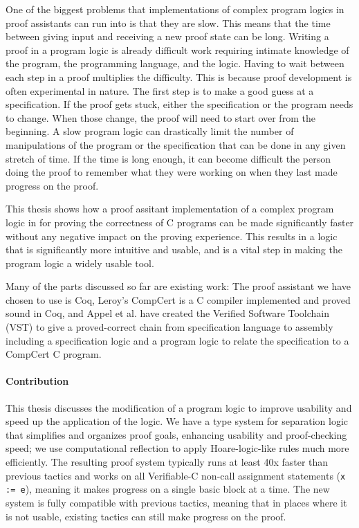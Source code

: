 \documentclass{puthesis}
\begin{document}
One of the biggest problems that implementations of complex program
logics in proof assistants can run into is that they are slow. This
means that the time between giving input and receiving a new proof
state can be long. Writing a proof in a program logic is already
difficult work requiring intimate knowledge of the program, the
programming language, and the logic. Having to wait between each step
in a proof multiplies the difficulty.  This is because proof
development is often experimental in nature. The first step is to make
a good guess at a specification. If the proof gets stuck, either the
specification or the program needs to change. When those change, the
proof will need to start over from the beginning. A slow program logic
can drastically limit the number of manipulations of the program or
the specification that can be done in any given stretch of time. If
the time is long enough, it can become difficult the person doing the
proof to remember what they were working on when they last made
progress on the proof.

This thesis shows how a proof assitant implementation of a complex
program logic in for proving the correctness of C programs can be made
significantly faster without any negative impact on the proving
experience. This results in a logic that is significantly more
intuitive and usable, and is a vital step in making the program logic
a widely usable tool.

Many of the parts discussed so far are existing work: The proof
assistant we have chosen to use is Coq, Leroy's CompCert
\cite{Leroy-Compcert-CACM} is a C compiler implemented and proved
sound in Coq, and Appel et al. \cite{appel14:plcc} have created the
Verified Software Toolchain (VST) to give a proved-correct chain from
specification language to assembly including a specification logic and
a program logic to relate the specification to a CompCert C program.

\paragraph{Contribution}
This thesis discusses the modification of a program logic to improve
usability and speed up the application of the logic. We have a type
system for separation logic that simplifies and organizes proof goals,
enhancing usability and proof-checking speed; we use computational
reflection to apply Hoare-logic-like rules much more efficiently.  The
resulting proof system typically runs at least 40x faster than
previous tactics and works on all Verifiable-C non-call assignment
statements (\lstinline|x := e|), meaning it makes progress on a single
basic block at a time. The new system is fully compatible with previous
tactics, meaning that in places where it is not usable, existing
tactics can still make progress on the proof.
\end{document}
